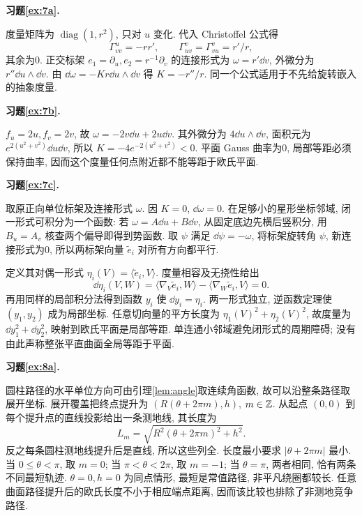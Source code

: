 \par{}
\par{}
\noindent\textbf{习题\ref{ex:7a}.}
\begin{solution}
度量矩阵为 $\operatorname{diag}(1,r^2)$, 只对 $u$ 变化. 代入 Christoffel 公式得
\[
 \Gamma^u_{vv}=-rr',\qquad \Gamma^v_{uv}=\Gamma^v_{vu}=r'/r,
\]
其余为0. 正交标架 $e_1=\partial_u,e_2=r^{-1}\partial_v$ 的连接形式为 $\omega=r'\dd v$, 外微分为 $r''\dd u\wedge\dd v$. 由 $\dd\omega=-K r\dd u\wedge\dd v$ 得 $K=-r''/r$. 同一个公式适用于不先给旋转嵌入的抽象度量.
\end{solution}
\par{}
\noindent\textbf{习题\ref{ex:7b}.}
\begin{solution}
$f_u=2u,f_v=2v$, 故 $\omega=-2v\dd u+2u\dd v$. 其外微分为 $4\dd u\wedge\dd v$, 面积元为 $e^{2(u^2+v^2)}\dd u\dd v$, 所以 $K=-4e^{-2(u^2+v^2)}<0$. 平面 Gauss 曲率为0, 局部等距必须保持曲率, 因而这个度量任何点附近都不能等距于欧氏平面.
\end{solution}
\par{}
\noindent\textbf{习题\ref{ex:7c}.}
\begin{solution}
取原正向单位标架及连接形式 $\omega$. 因 $K=0$, $\dd\omega=0$. 在足够小的星形坐标邻域, 闭一形式可积分为一个函数: 若 $\omega=A\dd u+B\dd v$, 从固定底边先横后竖积分, 用 $B_u=A_v$ 核查两个偏导即得到势函数. 取 $\psi$ 满足 $\dd\psi=-\omega$, 将标架旋转角 $\psi$, 新连接形式为0, 所以两标架向量 $\widetilde e_i$ 对所有方向都平行.

定义其对偶一形式 $\eta_i(V)=\langle\widetilde e_i,V\rangle$. 度量相容及无挠性给出
\[
 \dd\eta_i(V,W)=\langle\nabla_V\widetilde e_i,W\rangle-
 \langle\nabla_W\widetilde e_i,V\rangle=0.
\]
再用同样的局部积分法得到函数 $y_i$ 使 $\dd y_i=\eta_i$. 两一形式独立, 逆函数定理使 $(y_1,y_2)$ 成为局部坐标. 任意切向量的平方长度为 $\eta_1(V)^2+\eta_2(V)^2$, 故度量为 $\dd y_1^2+\dd y_2^2$, 映射到欧氏平面是局部等距. 单连通小邻域避免闭形式的周期障碍; 没有由此声称整张平直曲面全局等距于平面.
\end{solution}
\par{}
\par{}
\noindent\textbf{习题\ref{ex:8a}.}
\begin{solution}
圆柱路径的水平单位方向可由引理\ref{lem:angle}取连续角函数, 故可以沿整条路径取展开坐标. 展开覆盖把终点提升为 $(R(\theta+2\pi m),h)$, $m\in\mathbb Z$. 从起点 $(0,0)$ 到每个提升点的直线投影给出一条测地线, 其长度为
\[
 L_m=\sqrt{R^2(\theta+2\pi m)^2+h^2}.
\]
反之每条圆柱测地线提升后是直线, 所以这些列全. 长度最小要求 $|\theta+2\pi m|$ 最小. 当 $0\le\theta<\pi$, 取 $m=0$; 当 $\pi<\theta<2\pi$, 取 $m=-1$; 当 $\theta=\pi$, 两者相同, 恰有两条不同最短轨迹. $\theta=0,h=0$ 为同点情形, 最短是常值路径, 非平凡绕圈都较长. 任意曲面路径提升后的欧氏长度不小于相应端点距离, 因而该比较也排除了非测地竞争路径.
\end{solution}
